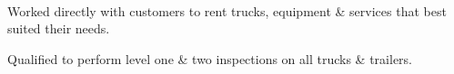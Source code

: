 \documentclass[]{hieudo-build}
\begin{document}
\begin{minipage}[t]{0.69\textwidth}

 \\
\begin{tightemize}
\item Worked directly with customers to rent trucks, equipment \& services that best suited their needs.
\item Qualified to perform level one \& two inspections on all trucks \& trailers.
\end{tightemize}
\sectionsep





\end{minipage} 
\end{document}
